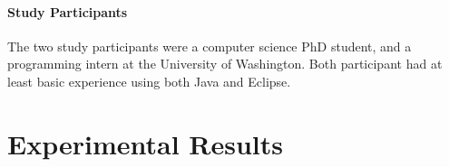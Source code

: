 \documentclass[nocopyrightspace,10pt]{sigplanconf}
\begin{document}
\paragraph{Study Participants}
The two study participants were a computer science PhD student, and a
programming intern at the University of Washington. Both participant
had at least basic experience using both Java and Eclipse.

\section{Experimental Results}
\label{sec:results}


\end{document}
